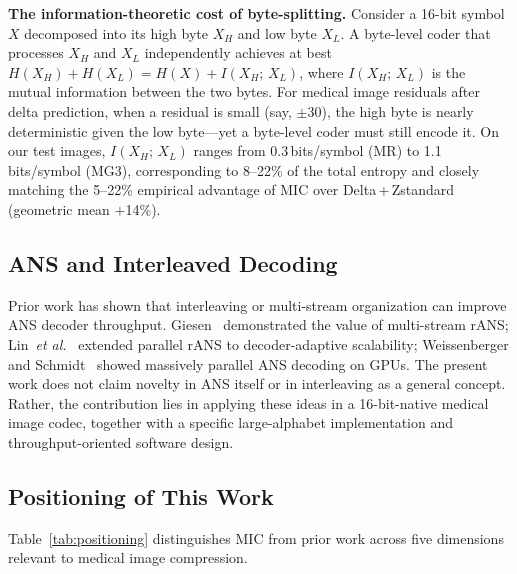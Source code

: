 \documentclass[journal]{IEEEtran}
\begin{document}
\textbf{The information-theoretic cost of byte-splitting.} Consider a 16-bit
symbol $X$ decomposed into its high byte $X_H$ and low byte $X_L$. A byte-level
coder that processes $X_H$ and $X_L$ independently achieves at best
$H(X_H) + H(X_L) = H(X) + I(X_H;\, X_L)$, where $I(X_H;\, X_L)$ is the
mutual information between the two bytes. For medical image residuals after
delta prediction, when a residual is small (say, $\pm 30$), the high byte is
nearly deterministic given the low byte---yet a byte-level coder must still
encode it. On our test images, $I(X_H;\, X_L)$ ranges from 0.3\,bits/symbol
(MR) to 1.1\,bits/symbol (MG3), corresponding to 8--22\% of the total entropy
and closely matching the 5--22\% empirical advantage of MIC over
Delta\,+\,Zstandard (geometric mean $+$14\%).

\subsection{ANS and Interleaved Decoding}

Prior work has shown that interleaving or multi-stream organization can improve
ANS decoder throughput. Giesen~\cite{giesen2014,giesen2014b} demonstrated the
value of multi-stream rANS; Lin~\textit{et al.}~\cite{lin2023} extended parallel
rANS to decoder-adaptive scalability; Weissenberger and
Schmidt~\cite{weissenberger2019} showed massively parallel ANS decoding on
GPUs. The present work does not claim novelty in ANS itself or in interleaving
as a general concept. Rather, the contribution lies in applying these ideas in a
16-bit-native medical image codec, together with a specific large-alphabet
implementation and throughput-oriented software design.

\subsection{Positioning of This Work}

Table~\ref{tab:positioning} distinguishes MIC from prior work across five
dimensions relevant to medical image compression.
\end{document}
